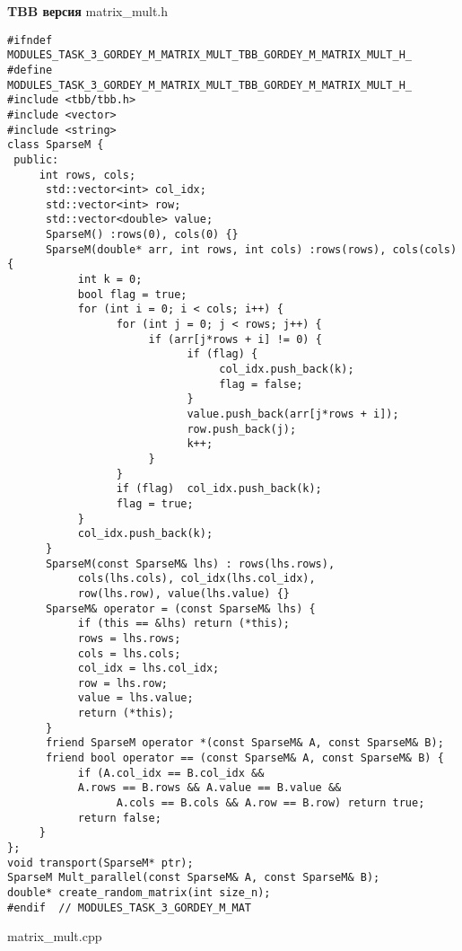 \documentclass{report}
\begin{document}
\textbf{TBB версия}
\newline
\newline matrix\_mult.h
\begin{lstlisting}
#ifndef MODULES_TASK_3_GORDEY_M_MATRIX_MULT_TBB_GORDEY_M_MATRIX_MULT_H_
#define MODULES_TASK_3_GORDEY_M_MATRIX_MULT_TBB_GORDEY_M_MATRIX_MULT_H_
#include <tbb/tbb.h>
#include <vector>
#include <string>
class SparseM {
 public:
     int rows, cols;
      std::vector<int> col_idx;
      std::vector<int> row;
      std::vector<double> value;
      SparseM() :rows(0), cols(0) {}
      SparseM(double* arr, int rows, int cols) :rows(rows), cols(cols) {
           int k = 0;
           bool flag = true;
           for (int i = 0; i < cols; i++) {
                 for (int j = 0; j < rows; j++) {
                      if (arr[j*rows + i] != 0) {
                            if (flag) {
                                 col_idx.push_back(k);
                                 flag = false;
                            }
                            value.push_back(arr[j*rows + i]);
                            row.push_back(j);
                            k++;
                      }
                 }
                 if (flag)  col_idx.push_back(k);
                 flag = true;
           }
           col_idx.push_back(k);
      }
      SparseM(const SparseM& lhs) : rows(lhs.rows),
           cols(lhs.cols), col_idx(lhs.col_idx),
           row(lhs.row), value(lhs.value) {}
      SparseM& operator = (const SparseM& lhs) {
           if (this == &lhs) return (*this);
           rows = lhs.rows;
           cols = lhs.cols;
           col_idx = lhs.col_idx;
           row = lhs.row;
           value = lhs.value;
           return (*this);
      }
      friend SparseM operator *(const SparseM& A, const SparseM& B);
      friend bool operator == (const SparseM& A, const SparseM& B) {
           if (A.col_idx == B.col_idx &&
           A.rows == B.rows && A.value == B.value &&
                 A.cols == B.cols && A.row == B.row) return true;
           return false;
     }
};
void transport(SparseM* ptr);
SparseM Mult_parallel(const SparseM& A, const SparseM& B);
double* create_random_matrix(int size_n);
#endif  // MODULES_TASK_3_GORDEY_M_MAT
\end{lstlisting}
matrix\_mult.cpp
\end{document}
